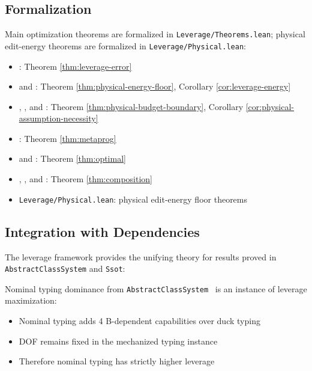 \subsection{Formalization}

Main optimization theorems are formalized in \texttt{Leverage/Theorems.lean}; physical edit-energy theorems are formalized in \texttt{Leverage/Physical.lean}:
\begin{itemize}
\item {}: Theorem \ref{thm:leverage-error}
\item {} and
  :
  Theorem \ref{thm:physical-energy-floor}, Corollary \ref{cor:leverage-energy}
\item {},
  , and
  :
  Theorem \ref{thm:physical-budget-boundary},
  Corollary \ref{cor:physical-assumption-necessity}
\item {}: Theorem \ref{thm:metaprog}
\item {} and :
  Theorem \ref{thm:optimal}
\item {},
  , and
  :
  Theorem \ref{thm:composition}
\item \texttt{Leverage/Physical.lean}: physical edit-energy floor theorems
\end{itemize}

\subsection{Integration with Dependencies}

The leverage framework provides the unifying theory for results proved in \texttt{AbstractClassSystem} and \texttt{Ssot}:

\begin{theorem}\label{thm:paper1-integration}
Nominal typing dominance from \texttt{AbstractClassSystem}~\cite{paper1_typing_discipline} is an instance of leverage maximization:
\begin{itemize}
\item Nominal typing adds 4 B-dependent capabilities over duck typing
\item DOF remains fixed in the mechanized typing instance
\item Therefore nominal typing has strictly higher leverage
\end{itemize}
\end{theorem}

